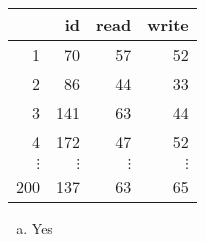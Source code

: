 \documentclass[slidestop,compress,mathserif]{beamer}
\begin{document}
\begin{frame}


{\small
\begin{center}
\begin{tabular}{rrrr}
  \hline
 & id & read & write \\ 
  \hline
1 & 70 & 57 & 52 \\ 
  2 & 86 & 44 & 33 \\ 
  3 & 141 & 63 & 44 \\ 
  4 & 172 & 47 & 52 \\ 
  $\vdots$ &   $\vdots$  &   $\vdots$ &   $\vdots$  \\
  200 & 137 & 63 & 65 \\ 
   \hline
\end{tabular}
\end{center}
}

\begin{multicols}{2}
\begin{enumerate}[(a)]
\item Yes
\end{enumerate}
\end{multicols}

\end{frame}

\end{document}

